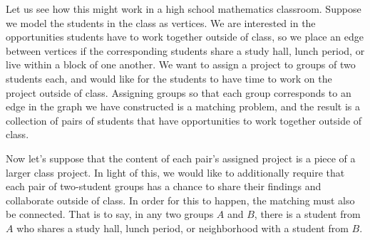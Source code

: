Let us see how this might work in a high school mathematics classroom.  Suppose we model the students in the class as vertices. We are interested in the opportunities students have to work together outside of class, so we place an edge between vertices if the corresponding students share a study hall, lunch period, or live within a block of one another.  We want to assign a project to groups of two students each, and would like for the students to have time to work on the project outside of class.  Assigning groups so that each group corresponds to an edge in the graph we have constructed is a matching problem, and the result is a collection of pairs of students that have opportunities to work together outside of class.  

Now let's suppose that the content of each pair's assigned project is a piece of a larger class project.  In light of this, we would like to additionally require that each pair of two-student groups has a chance to share their findings and collaborate outside of class.  In order for this to happen, the matching must also be connected.  That is to say, in any two groups $A$ and $B$, there is a student from $A$ who shares a study hall, lunch period, or neighborhood with a student from $B$.  


	